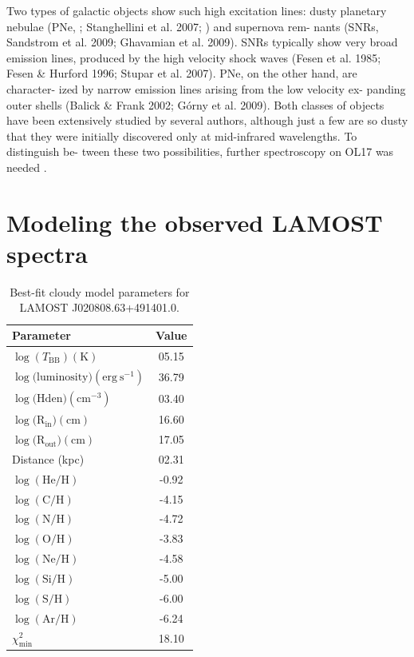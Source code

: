 \documentclass[fleqn,usenatbib]{mnras}
\begin{document}
{Two types of galactic objects show such high excitation
lines: dusty planetary nebulae (PNe, ;
Stanghellini et al. 2007; \citealp{Guiles:2007}) and supernova rem-
nants (SNRs, Sandstrom et al. 2009; Ghavamian et al. 2009).
SNRs typically show very broad emission lines, produced by the
high velocity shock waves (Fesen et al. 1985; Fesen \& Hurford
1996; Stupar et al. 2007). PNe, on the other hand, are character-
ized by narrow emission lines arising from the low velocity ex-
panding outer shells (Balick \& Frank 2002; Górny et al. 2009).
Both classes of objects have been extensively studied by several
authors, although just a few are so dusty that they were initially
discovered only at mid-infrared wavelengths. To distinguish be-
tween these two possibilities, further spectroscopy on OL17 was
needed \citep{Oliveira:2011}.

\section{Modeling the observed LAMOST spectra}
\label{sec:model}

\begin{table}
	\centering
	\caption{Best-fit {\sc cloudy} model parameters for LAMOST J020808.63+491401.0.}
	\label{tab:example_table}
	\begin{tabular}{lc} %
                \hline
		\hline
		Parameter & Value \\
                \hline
		$\log(T_{\mathrm{BB}}) (\mathrm{K})$  & 05.15  \\
		$\log(\mathrm{luminosity) (erg~s^{-1})}$ & 36.79 \\
		$\log(\mathrm{Hden) (cm^{-3})} $ & 03.40  \\
                 $\log(\mathrm{R_{in}) (cm)}$ &  16.60\\
                $\log(\mathrm{R_{out}) (cm)}$ & 17.05 \\
                Distance (kpc) & 02.31  \\
                $\log(\mathrm{He/H})$ & -0.92 \\
                $\log(\mathrm{C/H})$ & -4.15 \\
                $\log(\mathrm{N/H})$ & -4.72 \\
                $\log(\mathrm{O/H})$ &  -3.83\\ 
                $\log(\mathrm{Ne/H})$ & -4.58 \\
                $\log(\mathrm{Si/H})$ & -5.00\\ 
                $\log(\mathrm{S/H})$ &  -6.00\\ 
                $\log(\mathrm{Ar/H})$ & -6.24\\
                 \hline
                 $\chi^2_{\text{min}}$ & 18.10  \\
                 

\end{tabular}
\end{table}}
\end{document}

